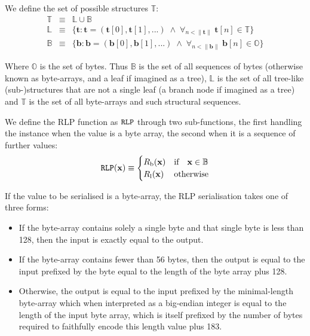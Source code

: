 \documentclass[9pt,oneside]{amsart}
\begin{document}
We define the set of possible structures $\mathbb{T}$:
\begin{eqnarray}
\mathbb{T} & \equiv & \mathbb{L} \cup \mathbb{B} \\
\mathbb{L} & \equiv & \{ \mathbf{t}: \mathbf{t} = ( \mathbf{t}[0], \mathbf{t}[1], ... ) \; \wedge \; \forall_{n < \lVert \mathbf{t} \rVert} \; \mathbf{t}[n] \in \mathbb{T} \} \\
\mathbb{B} & \equiv & \{ \mathbf{b}: \mathbf{b} = ( \mathbf{b}[0], \mathbf{b}[1], ... ) \; \wedge \; \forall_{n < \lVert \mathbf{b} \rVert} \; \mathbf{b}[n] \in \mathbb{O} \}
\end{eqnarray}

Where $\mathbb{O}$ is the set of bytes. Thus $\mathbb{B}$ is the set of all sequences of bytes (otherwise known as byte-arrays, and a leaf if imagined as a tree), $\mathbb{L}$ is the set of all tree-like (sub-)structures that are not a single leaf (a branch node if imagined as a tree) and $\mathbb{T}$ is the set of all byte-arrays and such structural sequences.

We define the RLP function as $\mathtt{\tiny RLP}$ through two sub-functions, the first handling the instance when the value is a byte array, the second when it is a sequence of further values:
\begin{equation}
\mathtt{\tiny RLP}(\mathbf{x}) \equiv \begin{cases} R_{\mathrm{b}}(\mathbf{x}) & \text{if} \quad \mathbf{x} \in \mathbb{B} \\ R_{\mathrm{l}}(\mathbf{x}) & \text{otherwise} \end{cases}
\end{equation}

\hypertarget{RLP_serialisation_of_a_byte_array_R__b_word_def}{}If the value to be serialised is a byte-array, the RLP serialisation takes one of three forms:

\begin{itemize}
\item If the byte-array contains solely a single byte and that single byte is less than 128, then the input is exactly equal to the output.
\item If the byte-array contains fewer than 56 bytes, then the output is equal to the input prefixed by the byte equal to the length of the byte array plus 128.
\item Otherwise, the output is equal to the input prefixed by the minimal-length byte-array which when interpreted as a big-endian integer is equal to the length of the input byte array, which is itself prefixed by the number of bytes required to faithfully encode this length value plus 183.
\end{itemize}
\end{document}
